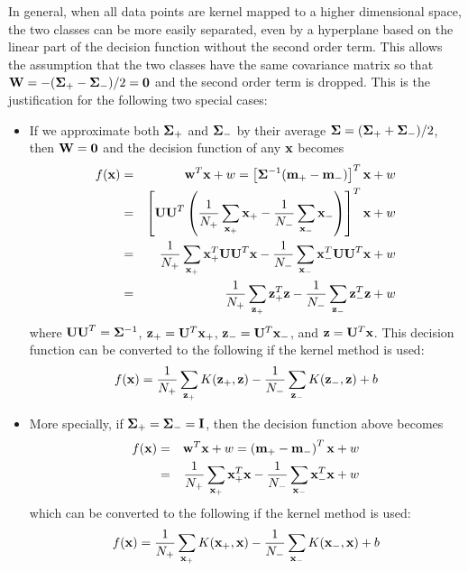 \documentclass{article}
\begin{document}
In general, when all data points are kernel mapped to a higher 
dimensional space, the two classes can be more easily separated, 
even by a hyperplane based on the linear part of the decision
function without the second order term. This allows the assumption
that the two classes have the same covariance matrix so that
${\bf W}=-({\bf\Sigma}_+-{\bf\Sigma}_-)/2={\bf 0}$ and the second 
order term is dropped. This is the justification for the following
two special cases:
\begin{itemize}
\item If we approximate both ${\bf\Sigma}_+$ and ${\bf\Sigma}_-$
  by their average ${\bf\Sigma}=({\bf\Sigma}_++{\bf\Sigma}_-)/2$,
  then ${\bf W}={\bf 0}$ and the decision function of any ${\bf x}$ 
  becomes
  \begin{eqnarray}
    f({\bf x})&=&{\bf w}^T{\bf x}+w
    =\left[{\bf\Sigma}^{-1}({\bf m}_+-{\bf m}_-)\right]^T{\bf x}+w
    \nonumber\\
    &=&\left[{\bf UU}^T\left(\frac{1}{N_+}\sum_{{\bf x}_+}{\bf x}_+
      -\frac{1}{N_-}\sum_{{\bf x}_-}{\bf x}_-\right)\right]^T{\bf x}+w
    \nonumber\\
    &=&\frac{1}{N_+}\sum_{{\bf x}_+}{\bf x}_+^T{\bf UU}^T{\bf x}
      -\frac{1}{N_-}\sum_{{\bf x}_-}{\bf x}_-^T{\bf UU}^T{\bf x}+w
    \nonumber\\
    &=&\frac{1}{N_+}\sum_{{\bf z}_+}{\bf z}_+^T{\bf z}
    -\frac{1}{N_-}\sum_{{\bf z}_-}{\bf z}_-^T{\bf z}+w
    \label{TypeII}
  \end{eqnarray}
  where ${\bf UU}^T={\bf\Sigma}^{-1}$, ${\bf z}_+={\bf U}^T{\bf x}_+$,
  ${\bf z}_-={\bf U}^T{\bf x}_-$, and ${\bf z}={\bf U}^T{\bf x}$. 
  This decision function can be converted to the following if the 
  kernel method is used:
  \begin{equation}  
    f({\bf x})=\frac{1}{N_+}\sum_{{\bf z}_+}K({\bf z}_+,{\bf z})
    -\frac{1}{N_-}\sum_{{\bf z}_-}K({\bf z}_-,{\bf z})+b
  \end{equation}  

\item More specially, if ${\bf\Sigma}_+={\bf\Sigma}_-={\bf I}$, then 
  the decision function above becomes
  \begin{eqnarray}
    f({\bf x})&=&{\bf w}^T{\bf x}+w
    =\left( {\bf m}_+-{\bf m}_- \right)^T {\bf x}+w
    \nonumber\\
    &=&\frac{1}{N_+}\sum_{{\bf x}_+}{\bf x}_+^T{\bf x}
    -\frac{1}{N_-}\sum_{{\bf x}_-}{\bf x}_-^T{\bf x}+w
    \label{TypeI1}
  \end{eqnarray}
  which can be converted to the following if the kernel method is used:
  \begin{equation}  
    f({\bf x})=\frac{1}{N_+}\sum_{{\bf x}_+}K({\bf x}_+,{\bf x})
    -\frac{1}{N_-}\sum_{{\bf x}_-}K({\bf x}_-,{\bf x})+b
    \label{TypeI2}
  \end{equation}  


\end{itemize}
\end{document}
